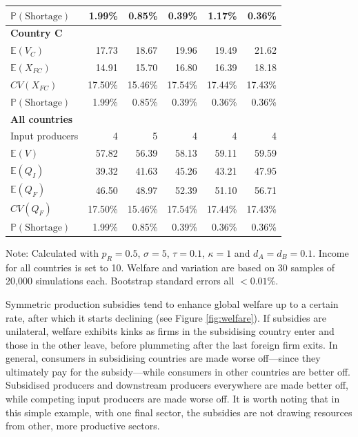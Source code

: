 \documentclass{article}
\begin{document}
\begin{table}
\begin{threeparttable}
\begin{tabular}{lrrrrr}
            $\mathbb{P}(\text{Shortage})$ & 1.99\% & 0.85\% & 0.39\% & 1.17\% & 0.36\% \\ 
            \midrule
            \textbf{Country C} \\
            $\mathbb{E}(V_C)$ & 17.73 & 18.67 & 19.96 & 19.49 & 21.62 \\
            $\mathbb{E}(X_{FC})$ & 14.91 & 15.70 & 16.80 & 16.39 & 18.18 \\
            $CV(X_{FC})$ & 17.50\% & 15.46\% & 17.54\% & 17.44\% & 17.43\% \\
            $\mathbb{P}(\text{Shortage})$ & 1.99\% & 0.85\% & 0.39\% & 0.36\% & 0.36\% \\ 
            \midrule
            \textbf{All countries} \\
            Input producers & 4 & 5 & 4 & 4 & 4 \\
            $\mathbb{E}(V)$ & 57.82 & 56.39 & 58.13 & 59.11 & 59.59 \\
            $\mathbb{E}(Q_{I})$ & 39.32 & 41.63 & 45.26 & 43.21 & 47.95 \\
            $\mathbb{E}(Q_{F})$ & 46.50 & 48.97 & 52.39 & 51.10 & 56.71 \\
            $CV(Q_{F})$ & 17.50\% & 15.46\% & 17.54\% & 17.44\% & 17.43\% \\
            $\mathbb{P}(\text{Shortage})$ & 1.99\% & 0.85\% & 0.39\% & 0.36\% & 0.36\% \\ 
            \bottomrule
        \end{tabular}
        \begin{tablenotes}
            \small \item Note: Calculated with $p_R = 0.5$, $\sigma = 5$, $\tau = 0.1$, $\kappa = 1$ and $d_A = d_B = 0.1$. Income for all countries is set to 10. Welfare and variation are based on 30 samples of 20,000 simulations each. Bootstrap standard errors all $<0.01\%$.
        \end{tablenotes}
    \end{threeparttable}
\end{table}

Symmetric production subsidies tend to enhance global welfare up to a certain rate, after which it starts declining (see Figure \ref{fig:welfare}). If subsidies are unilateral, welfare exhibits kinks as firms in the subsidising country enter and those in the other leave, before plummeting after the last foreign firm exits. In general, consumers in subsidising countries are made worse off---since they ultimately pay for the subsidy---while consumers in other countries are better off. Subsidised producers and downstream producers everywhere are made better off, while competing input producers are made worse off. It is worth noting that in this simple example, with one final sector, the subsidies are not drawing resources from other, more productive sectors.
\end{document}
